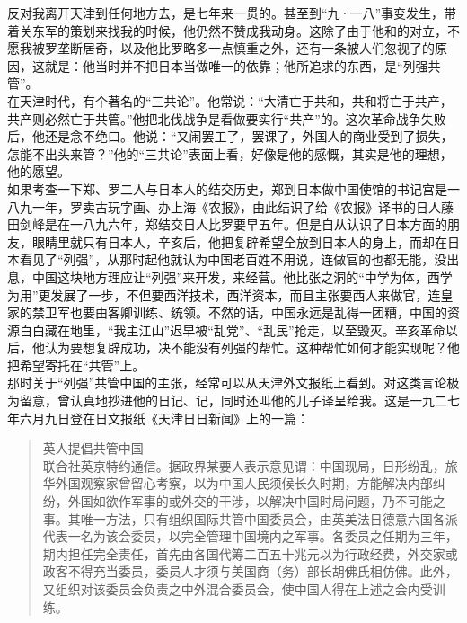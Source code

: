 反对我离开天津到任何地方去，是七年来一贯的。甚至到“九·一八”事变发生，带着关东军的策划来找我的时候，他仍然不赞成我动身。这除了由于他和的对立，不愿我被罗垄断居奇，以及他比罗略多一点慎重之外，还有一条被人们忽视了的原因，这就是：他当时并不把日本当做唯一的依靠；他所追求的东西，是“列强共管”。\\

在天津时代，有个著名的“三共论”。他常说：“大清亡于共和，共和将亡于共产，共产则必然亡于共管。”他把北伐战争是看做要实行“共产”的。这次革命战争失败后，他还是念不绝口。他说：“又闹罢工了，罢课了，外国人的商业受到了损失，怎能不出头来管？”他的“三共论”表面上看，好像是他的感慨，其实是他的理想，他的愿望。\\

如果考查一下郑、罗二人与日本人的结交历史，郑到日本做中国使馆的书记宫是一八九一年，罗卖古玩字画、办上海《农报》，由此结识了给《农报》译书的日人藤田剑峰是在一八九六年，郑结交日人比罗要早五年。但是自从认识了日本方面的朋友，眼睛里就只有日本人，辛亥后，他把复辟希望全放到日本人的身上，而却在日本看见了“列强”，从那时起他就认为中国老百姓不用说，连做官的也都无能，没出息，中国这块地方理应让“列强”来开发，来经营。他比张之洞的“中学为体，西学为用”更发展了一步，不但要西洋技术，西洋资本，而且主张要西人来做官，连皇家的禁卫军也要由客卿训练、统领。不然的话，中国永远是乱得一团糟，中国的资源白白藏在地里，“我主江山”迟早被“乱党”、“乱民”抢走，以至毁灭。辛亥革命以后，他认为要想复辟成功，决不能没有列强的帮忙。这种帮忙如何才能实现呢？他把希望寄托在“共管”上。\\

那时关于“列强”共管中国的主张，经常可以从天津外文报纸上看到。对这类言论极为留意，曾认真地抄进他的日记、记，同时还叫他的儿子译呈给我。这是一九二七年六月九日登在日文报纸《天津日日新闻》上的一篇：\\

\begin{quote}
	英人提倡共管中国\\

联合社英京特约通信。据政界某要人表示意见谓：中国现局，日形纷乱，旅华外国观察家曾留心考察，以为中国人民须候长久时期，方能解决内部纠纷，外国如欲作军事的或外交的干涉，以解决中国时局问题，乃不可能之事。其唯一方法，只有组织国际共管中国委员会，由英美法日德意六国各派代表一名为该会委员，以完全管理中国境内之军事。各委员之任期为三年，期内担任完全责任，首先由各国代筹二百五十兆元以为行政经费，外交家或政客不得充当委员，委员人才须与美国商（务）部长胡佛氏相仿佛。此外，又组织对该委员会负责之中外混合委员会，使中国人得在上述之会内受训练。\\
\end{quote}

